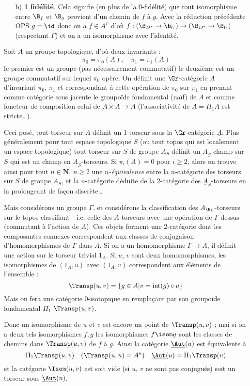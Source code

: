 \begin{enumerate}
    \item[b)] {\bf 1 fidélité}. Cela signifie (en plus de la 0-fidélité) que tout isomorphisme entre $\B_f$ et $\B_g$ provient d'un chemin de $f$ à $g$. Avec la réduction précédente OPS $g = \id$ donc on a $f \in A^\Gamma$ d'où $f: (\B_{D^*} \to \b_U) \to (\B_{D^*} \to \B_U)$ (respectant $\Gamma$) et on a un isomorphisme avec l'identité.
\end{enumerate}
Soit $A$ un groupe topologique, d'où deux invariants :
$$
\pi_0 = \pi_0 (A), \quad \pi_1 = \pi_1(A)
$$
le premier est un groupe (pas nécessairement commutatif) le deuxième est un groupe commutatif sur lequel $\pi_0$ opère. On définit une $\Gr$-catégorie $\underline{A}$ d'invariant $\pi_0$, $\pi_1$ et correspondant à cette opération de $\pi_0$ sur $\pi_1$ en prenant comme catégorie sous jacente le groupoïde fondamental (naïf) de $A$ et comme foncteur de composition celui de $A \times A \to A$ (l'associativité de $\underline{A} = \Pi_1 A$ est stricte\dots).

Ceci posé, tout torseur sur $A$ définit un 1-torseur sous la $\Gr$-catégorie $\underline{A}$. Plus généralement pour tout espace topologique $S$ (ou tout topos qui est localement un espace topologique) tout torseur sur $S$ de groupe $A_S$ définit un $\underline{A}_S$-champ sur $S$ qui est un champ en $\underline{A}_S$-torseurs. Si $\pi_i (A) = 0$ pour $i \geq 2$, alors on trouve ainsi pour tout $n \in \mathbf{N}$, $n \geq 2$ une \emph{$n$-équivalence} entre la $n$-catégorie des torseurs sur $S$ de groupe $A_S$, et la $n$-catégorie déduite de la 2-catégorie des $\underline{A}_S$-torseurs en la prolongeant de fa\c{c}on discrète\dots 

Mais considérons un groupe $\Gamma$, et considérons la classification des $A_{\B_\Gamma}$-torseurs sur le topos classifiant - i.e. celle des $A$-torseurs avec une opération de $\Gamma$ dessus (commutant à l'action de $A$). Ces objets forment une 2-catégorie dont les composantes connexes correspondent aux classes de conjugaison d'homomorphismes de $\Gamma$ dans $A$. Si on a un homomorphisme $\Gamma \to A$, il définit une action sur le torseur trivial $1_A$. Si $u$, $v$ sont deux homomorphismes, les isomorphismes de $(1_A, u)$ avec $(1_A, v)$ correspondent aux éléments de l'ensemble :
$$
\Transp (u, v) = \{ g \in A | v = \text{int}(g) \circ u \}
$$
Mais on fera une catégorie 0-isotopique en rempla\c{c}ant par son groupoïde fondamental $\Pi_1$ $\Transp (u, v)$. 

Donc un isomorphisme de $u$ et $v$ est encore un point de $\Transp (u, v)$ ; mai si on a deux tels isomorphismes $f, g$ les isomorphismes $f \isom g$ sont les classes de chemins dans $\Transp (u, v)$ de $f$ à $g$. Ainsi la catégorie $\underline{\Aut}(u)$ est équivalente à
$$
\Pi_1 \Transp (u, v) \quad (\Transp (u, u) = A^u) \quad \underline{\Aut}(u) = \Pi_1 \Transp (u)
$$
et la catégorie $\Isom (u, v)$ est soit vide (si $u$, $v$ ne sont pas conjugués) soit un torseur sous $\underline{\Aut}(u)$.

